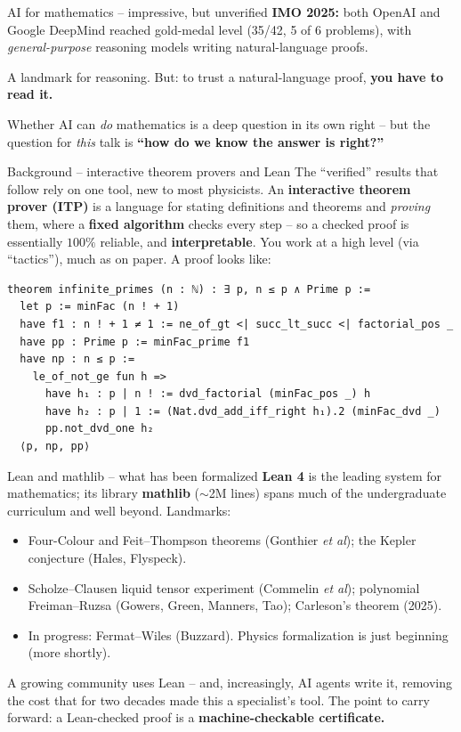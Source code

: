 \documentclass[aspectratio=169,xcolor=dvipsnames]{beamer}
\def\p{\\[0.1in] \pause}
\begin{document}
\begin{frame}{AI for mathematics -- impressive, but unverified}
\textbf{IMO 2025:} both OpenAI and Google DeepMind reached gold-medal level
(35/42, 5 of 6 problems), with \emph{general-purpose} reasoning models writing
natural-language proofs. \p

A landmark for reasoning.  But: to trust a natural-language proof, {\bf you have to read it.} \p

\pause
Whether AI can \emph{do} mathematics is a deep question in its own right -- but the
question for \emph{this} talk is \textbf{``how do we know the answer is right?''}
\end{frame}

\begin{frame}[fragile]{Background -- interactive theorem provers and Lean}
The ``verified'' results that follow rely on one tool, new to most physicists.
An \textbf{interactive theorem prover (ITP)} is a language for stating definitions and
theorems and \emph{proving} them, where a \textbf{fixed algorithm} checks every step -- so a
checked proof is essentially $100\%$ reliable, and \textbf{interpretable}.  You work at a high
level (via ``tactics''), much as on paper.  A proof looks like:
\smallskip
{\scriptsize
\begin{lstlisting}[language=lean]
theorem infinite_primes (n : ℕ) : ∃ p, n ≤ p ∧ Prime p :=
  let p := minFac (n ! + 1)
  have f1 : n ! + 1 ≠ 1 := ne_of_gt <| succ_lt_succ <| factorial_pos _
  have pp : Prime p := minFac_prime f1
  have np : n ≤ p :=
    le_of_not_ge fun h =>
      have h₁ : p | n ! := dvd_factorial (minFac_pos _) h
      have h₂ : p | 1 := (Nat.dvd_add_iff_right h₁).2 (minFac_dvd _)
      pp.not_dvd_one h₂
  ⟨p, np, pp⟩
\end{lstlisting}}
\end{frame}

\begin{frame}{Lean and mathlib -- what has been formalized}
\textbf{Lean 4} is the leading system for mathematics; its library \textbf{mathlib}
($\sim$2M lines) spans much of the undergraduate curriculum and well beyond.  Landmarks:
\begin{itemize}
  \item Four-Colour and Feit--Thompson theorems (Gonthier \emph{et al}); the Kepler
        conjecture (Hales, Flyspeck).
  \item Scholze--Clausen liquid tensor experiment (Commelin \emph{et al}); polynomial
        Freiman--Ruzsa (Gowers, Green, Manners, Tao); Carleson's theorem (2025).
  \item In progress: Fermat--Wiles (Buzzard).  Physics formalization is just beginning
        (more shortly).
\end{itemize} \pause
\smallskip
A growing community uses Lean -- and, increasingly, AI agents write it, removing the cost
that for two decades made this a specialist's tool. \pause
\smallskip
The point to carry forward: a Lean-checked proof is a \textbf{machine-checkable certificate.}
\end{frame}
\end{document}
